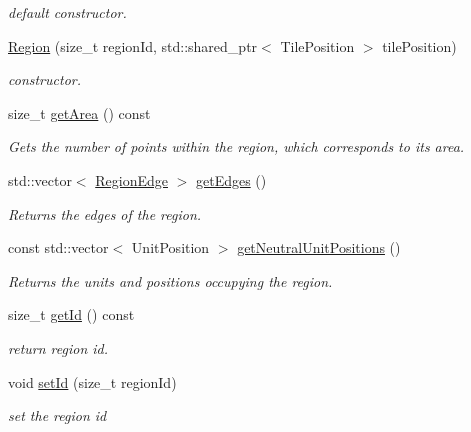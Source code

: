 \begin{DoxyCompactItemize}
\begin{DoxyCompactList}\small\item\em default constructor. \end{DoxyCompactList}\item 
\hyperlink{classOverseer_1_1Region_a8de3309b915589c86745a73c157d4a9f}{Region} (size\+\_\+t region\+Id, std\+::shared\+\_\+ptr$<$ Tile\+Position $>$ tile\+Position)
\begin{DoxyCompactList}\small\item\em constructor. \end{DoxyCompactList}\item 
size\+\_\+t \hyperlink{classOverseer_1_1Region_af4f0876669c6698a728bb84a0d13ff8d}{get\+Area} () const 
\begin{DoxyCompactList}\small\item\em Gets the number of points within the region, which corresponds to it\textquotesingle{}s area. \end{DoxyCompactList}\item 
std\+::vector$<$ \hyperlink{classOverseer_1_1RegionEdge}{Region\+Edge} $>$ \hyperlink{classOverseer_1_1Region_a99e292f7974c6db66078506b2b7e0f8a}{get\+Edges} ()
\begin{DoxyCompactList}\small\item\em Returns the edges of the region. \end{DoxyCompactList}\item 
const std\+::vector$<$ Unit\+Position $>$ \hyperlink{classOverseer_1_1Region_a9ac3f900c0b0b260ded354769337149d}{get\+Neutral\+Unit\+Positions} ()
\begin{DoxyCompactList}\small\item\em Returns the units and positions occupying the region. \end{DoxyCompactList}\item 
size\+\_\+t \hyperlink{classOverseer_1_1Region_a57d131cc0afadfb9a1292471cb9477a5}{get\+Id} () const 
\begin{DoxyCompactList}\small\item\em return region id. \end{DoxyCompactList}\item 
void \hyperlink{classOverseer_1_1Region_a52fa1e6684d036d9f2761ec4cf85cd62}{set\+Id} (size\+\_\+t region\+Id)
\begin{DoxyCompactList}\small\item\em set the region id \end{DoxyCompactList}\item 

\end{DoxyCompactItemize}
